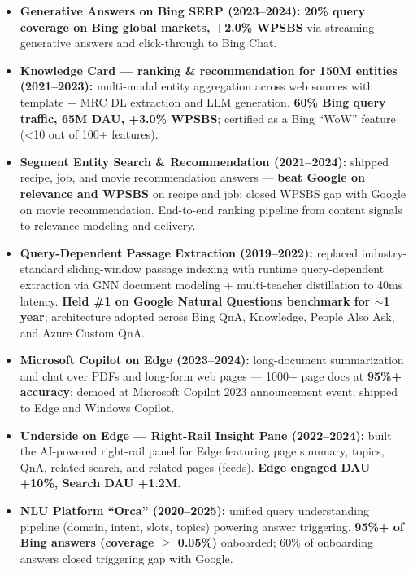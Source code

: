 \documentclass[10.5pt,letterpaper]{article}
\begin{document}
\begin{itemize}
  \item \textbf{Generative Answers on Bing SERP (2023--2024):} \textbf{20\% query coverage on Bing global markets, +2.0\% WPSBS} via streaming generative answers and click-through to Bing Chat.

  \item \textbf{Knowledge Card --- ranking \& recommendation for 150M entities (2021--2023):} multi-modal entity aggregation across web sources with template + MRC DL extraction and LLM generation. \textbf{60\% Bing query traffic, 65M DAU, +3.0\% WPSBS}; certified as a Bing ``WoW'' feature (<10 out of 100+ features).

  \item \textbf{Segment Entity Search \& Recommendation (2021--2024):} shipped recipe, job, and movie recommendation answers — \textbf{beat Google on relevance and WPSBS} on recipe and job; closed WPSBS gap with Google on movie recommendation. End-to-end ranking pipeline from content signals to relevance modeling and delivery.

  \item \textbf{Query-Dependent Passage Extraction (2019--2022):} replaced industry-standard sliding-window passage indexing with runtime query-dependent extraction via GNN document modeling + multi-teacher distillation to 40ms latency. \textbf{Held \#1 on Google Natural Questions benchmark for $\sim$1 year}; architecture adopted across Bing QnA, Knowledge, People Also Ask, and Azure Custom QnA.

  \item \textbf{Microsoft Copilot on Edge (2023--2024):} long-document summarization and chat over PDFs and long-form web pages — 1000+ page docs at \textbf{95\%+ accuracy}; demoed at Microsoft Copilot 2023 announcement event; shipped to Edge and Windows Copilot.

  \item \textbf{Underside on Edge --- Right-Rail Insight Pane (2022--2024):} built the AI-powered right-rail panel for Edge featuring page summary, topics, QnA, related search, and related pages (feeds). \textbf{Edge engaged DAU +10\%, Search DAU +1.2M.}

  \item \textbf{NLU Platform ``Orca'' (2020--2025):} unified query understanding pipeline (domain, intent, slots, topics) powering answer triggering. \textbf{95\%+ of Bing answers (coverage $\ge$ 0.05\%)} onboarded; 60\% of onboarding answers closed triggering gap with Google.
\end{itemize}
\end{document}
